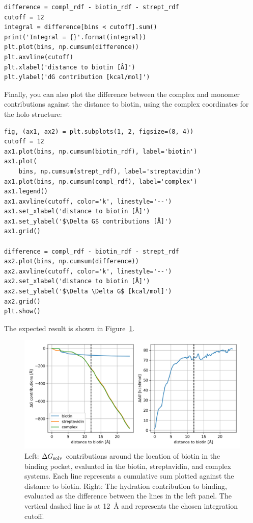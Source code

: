 \documentclass[9pt,tutorial]{livecoms}
\newcommand{\dgsolv}{\Delta G_\textup{solv}}
\begin{document}
\begin{lstlisting}[style=python]
difference = compl_rdf - biotin_rdf - strept_rdf
cutoff = 12
integral = difference[bins < cutoff].sum()
print('Integral = {}'.format(integral))
plt.plot(bins, np.cumsum(difference))
plt.axvline(cutoff)
plt.xlabel('distance to biotin [Å]')
plt.ylabel('dG contribution [kcal/mol]')
\end{lstlisting}
Finally, you can also plot the difference between the complex and monomer contributions against the distance to biotin, using the complex coordinates for the holo structure:

\begin{lstlisting}[style=python]
fig, (ax1, ax2) = plt.subplots(1, 2, figsize=(8, 4))
cutoff = 12
ax1.plot(bins, np.cumsum(biotin_rdf), label='biotin')
ax1.plot(
    bins, np.cumsum(strept_rdf), label='streptavidin')
ax1.plot(bins, np.cumsum(compl_rdf), label='complex')
ax1.legend()
ax1.axvline(cutoff, color='k', linestyle='--')
ax1.set_xlabel('distance to biotin [Å]')
ax1.set_ylabel('$\Delta G$ contributions [Å]')
ax1.grid()

difference = compl_rdf - biotin_rdf - strept_rdf
ax2.plot(bins, np.cumsum(difference))
ax2.axvline(cutoff, color='k', linestyle='--')
ax2.set_xlabel('distance to biotin [Å]')
ax2.set_ylabel('$\Delta \Delta G$ [kcal/mol]')
ax2.grid()
plt.show()
\end{lstlisting}
The expected result is shown in Figure~\ref{fig-dg-sums}.
\begin{figure}[H]
	\centering
	\includegraphics[width=1.0\linewidth]{figures/deltaG-difference.png}
	\caption{Left: $\dgsolv$ contributions around the location of biotin in the binding pocket, evaluated in the biotin, streptavidin, and complex systems. Each line represents a cumulative sum plotted against the distance to biotin. Right: The hydration contribution to binding, evaluated as the difference between the lines in the left panel. The vertical dashed line is at \SI{12}{\angstrom} and represents the chosen integration cutoff.}\label{fig-dg-sums}
\end{figure}
\end{document}
